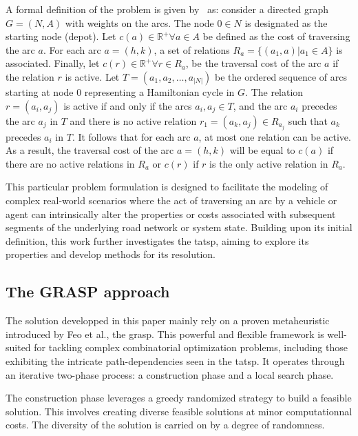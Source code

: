 \documentclass[twocolumn, switch]{article} %
\begin{document}
A formal definition of the problem is given by~\cite{Cerrone} as:
consider a directed graph $G = (N,A)$ with weights on the arcs. 
The node $0 \in N$ is designated as the starting node (depot). Let $c(a) \in \mathbb{R}^+ \forall a \in A$ 
be defined as the cost of traversing the arc $a$. For each arc $a=(h, k)$, a set of relations $R_a = \{(a_1, a)| a_1 \in A\}$ 
is associated. Finally, let $c(r) \in \mathbb{R}^+ \forall r \in R_a$, be the traversal cost of the arc $a$ if the relation $r$ 
is active. Let $T = (a_1, a_2, \ldots, a_{|N|})$ be the ordered sequence of arcs starting at node $0$ representing a Hamiltonian 
cycle in $G$. The relation $r = (a_i, a_j)$ is active if and only if the arcs $a_i, a_j \in T$, and the arc $a_i$ precedes the arc 
$a_j$ in $T$ and there is no active relation $r_1 = (a_k, a_j) \in R_{a_j}$ such that $a_k$ precedes $a_i$ in $T$. It follows that 
for each arc $a$, at most one relation can be active. As a result, the traversal cost of the arc $a = (h, k)$ will be equal to $c(a)$ 
if there are no active relations in $R_a$ or $c(r)$ if $r$ is the only active relation in $R_a$.

This particular problem formulation is designed to facilitate the modeling of complex real-world scenarios where the act of 
traversing an arc by a vehicle or agent can intrinsically alter the properties or costs associated with subsequent segments of 
the underlying road network or system state. Building upon its initial definition, this work further investigates the \gls{tatsp}, 
aiming to explore its properties and develop methods for its resolution.

\subsection{The GRASP approach}

The solution developped in this paper mainly rely on a proven metaheuristic introduced by Feo et al.\cite{Feo1995}, the \gls{grasp}. 
This powerful and flexible framework is well-suited for tackling complex combinatorial optimization problems, 
including those exhibiting the intricate path-dependencies seen in the \gls{tatsp}. It operates through an iterative 
two-phase process: a construction phase and a local search phase. 

The construction phase leverages a greedy randomized strategy to build a feasible solution. This involves creating diverse feasible 
solutions at minor computationnal costs. The diversity of the solution is carried on by a degree of randomness. 
\end{document}
